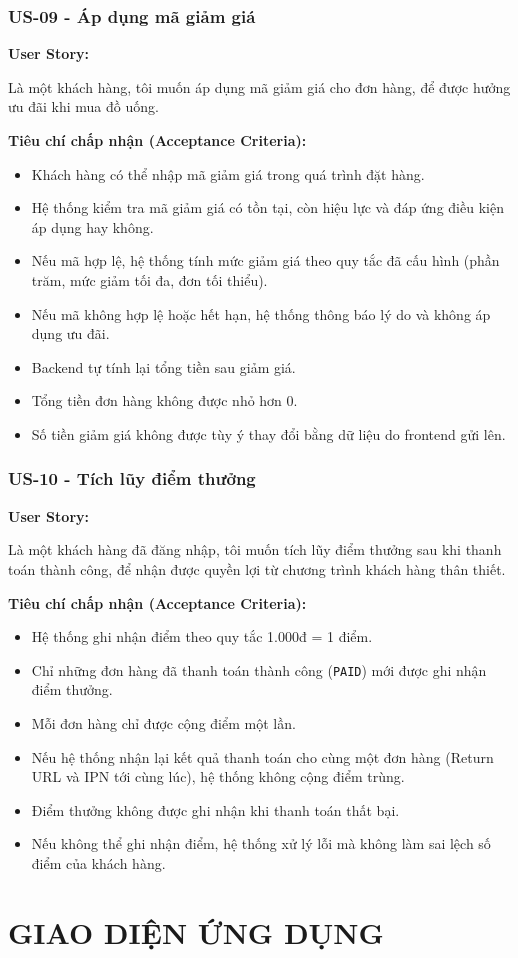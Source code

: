 \documentclass[12pt,a4paper]{article}
\newcommand{\userstory}[2]{%
  \noindent\textbf{User Story:}\par
  #1\par
  \hspace*{\parindent}\textbf{Tiêu chí chấp nhận (Acceptance Criteria):}
  \begin{itemize}
    #2
  \end{itemize}}
\begin{document}
\subsubsection{US-09 - Áp dụng mã giảm giá}
\userstory{Là một khách hàng, tôi muốn áp dụng mã giảm giá cho đơn hàng, để được hưởng ưu đãi khi mua đồ uống.}{
  \item Khách hàng có thể nhập mã giảm giá trong quá trình đặt hàng.
  \item Hệ thống kiểm tra mã giảm giá có tồn tại, còn hiệu lực và đáp ứng điều kiện áp dụng hay không.
  \item Nếu mã hợp lệ, hệ thống tính mức giảm giá theo quy tắc đã cấu hình (phần trăm, mức giảm tối đa, đơn tối thiểu).
  \item Nếu mã không hợp lệ hoặc hết hạn, hệ thống thông báo lý do và không áp dụng ưu đãi.
  \item Backend tự tính lại tổng tiền sau giảm giá.
  \item Tổng tiền đơn hàng không được nhỏ hơn 0.
  \item Số tiền giảm giá không được tùy ý thay đổi bằng dữ liệu do frontend gửi lên.
}

\subsubsection{US-10 - Tích lũy điểm thưởng}
\userstory{Là một khách hàng đã đăng nhập, tôi muốn tích lũy điểm thưởng sau khi thanh toán thành công, để nhận được quyền lợi từ chương trình khách hàng thân thiết.}{
  \item Hệ thống ghi nhận điểm theo quy tắc 1.000đ = 1 điểm.
  \item Chỉ những đơn hàng đã thanh toán thành công (\texttt{PAID}) mới được ghi nhận điểm thưởng.
  \item Mỗi đơn hàng chỉ được cộng điểm một lần.
  \item Nếu hệ thống nhận lại kết quả thanh toán cho cùng một đơn hàng (Return URL và IPN tới cùng lúc), hệ thống không cộng điểm trùng.
  \item Điểm thưởng không được ghi nhận khi thanh toán thất bại.
  \item Nếu không thể ghi nhận điểm, hệ thống xử lý lỗi mà không làm sai lệch số điểm của khách hàng.
}

\section{GIAO DIỆN ỨNG DỤNG}
\end{document}
